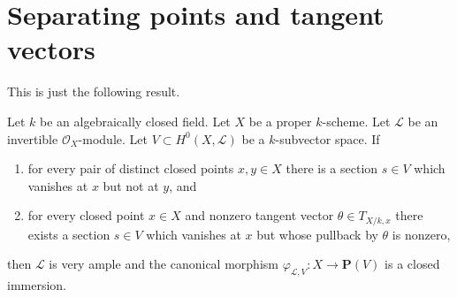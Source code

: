 \section{Separating points and tangent vectors}
\label{section-separating-points-tangent-vectors}

\noindent
This is just the following result.

\begin{lemma}
\label{lemma-separate-points-tangent-vectors}
Let $k$ be an algebraically closed field.
Let $X$ be a proper $k$-scheme.
Let $\mathcal{L}$ be an invertible $\mathcal{O}_X$-module.
Let $V \subset H^0(X, \mathcal{L})$ be a $k$-subvector space. If
\begin{enumerate}
\item for every pair of distinct closed points $x, y \in X$
there is a section $s \in V$ which vanishes at $x$ but not at $y$, and
\item for every closed point $x \in X$ and nonzero tangent vector
$\theta \in T_{X/k, x}$ there exists a section $s \in V$
which vanishes at $x$ but whose pullback by $\theta$ is nonzero,
\end{enumerate}
then $\mathcal{L}$ is very ample and the canonical morphism
$\varphi_{\mathcal{L}, V} : X \to \mathbf{P}(V)$
is a closed immersion.
\end{lemma}

